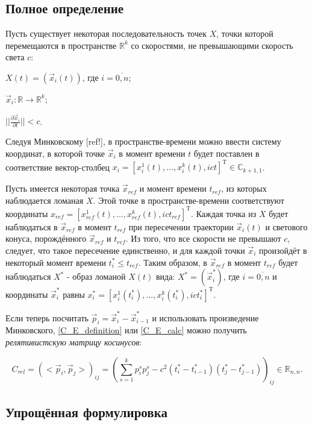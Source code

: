 \subsection{Полное определение}

Пусть существует некоторая последовательность точек $X$, точки которой перемещаются в пространстве $\mathbb{R}^{k}$ со скоростями, не превышающими скорость света $c$:

$X(t) = (\vec{x}_{i}(t))$, где $i = \overline{0,n}$;

$\vec{x}_i : \mathbb{R} \rightarrow \mathbb{R}^{k}$;

$||\frac{\partial{\vec{x}_i}}{\partial{t}}|| < c$.

Следуя Минковскому [ref!], в пространстве-времени можно ввести систему координат, в которой точке $\vec{x}_i$ в момент времени $t$ будет поставлен в соответствие вектор-столбец $x_i = [x^1_i(t), ..., x^k_i(t), ict]^\mathrm{T} \in \mathbb{C}_{k+1,1}$.

Пусть имеется некоторая точка $\vec{x}_{ref}$ и момент времени $t_{ref}$, из которых наблюдается ломаная $X$. Этой точке в пространстве-времени соответствуют координаты $x_{ref} = [x^1_{ref}(t), ..., x^k_{ref}(t), ict_{ref}]^\mathrm{T}$. Каждая точка из $X$ будет наблюдаться в $\vec{x}_{ref}$ в момент $t_{ref}$ при пересечении траектории $\vec{x}_i(t)$ и светового конуса, порождённого $\vec{x}_{ref}$ и $t_{ref}$. Из того, что все скорости не превышают $c$, следует, что такое пересечение единственно, и для каждой точки $\vec{x}_i$ произойдёт в некоторый момент времени $t^*_i \le t_{ref}$. Таким образом, в $\vec{x}_{ref}$ в момент $t_{ref}$ будет наблюдаться $X^*$ - образ ломаной $X(t)$ вида:
$X^* = (\vec{x}^*_i)$, где $i = \overline{0,n}$ и координаты $\vec{x}^*_i$ равны $x^*_i = [x^1_i(t^*_i), ..., x^k_i(t^*_i), ict^*_i]^\mathrm{T}$.

Если теперь посчитать $\vec{p}_i = \vec{x}^*_i - \vec{x}^*_{i-1}$ и использовать произведение Минковского, \ref{C_E_definition} или \ref{C_E_calc} можно получить \textit{релятивистскую матрицу косинусов}:

\begin{equation}
	C_{rel} = {(<\vec{p}_{i}, \vec{p}_{j}>)}_{ij} = {\left(\sum_{s=1}^{k} p^s_i p^s_j - c^2(t^*_i - t^*_{i-1})(t^*_j - t^*_{j-1})\right)}_{ij} \in \mathbb{R}_{n,n}.
	\label{C_rel_definition}
\end{equation}

\subsection{Упрощённая формулировка}

